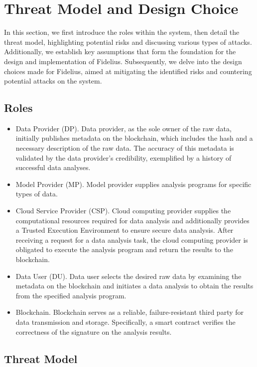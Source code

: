 \section{Threat Model and Design Choice}

In this section, we first introduce the roles within the system, then detail the threat model, highlighting potential risks and discussing various types of attacks. Additionally, we establish key assumptions that form the foundation for the design and implementation of Fidelius. Subsequently, we delve into the design choices made for Fidelius, aimed at mitigating the identified risks and countering potential attacks on the system.

\subsection{Roles}
\begin{itemize}
    \item Data Provider (DP). Data provider, as the sole owner of the raw data, initially publishes metadata on the blockchain, which includes the hash and a necessary description of the raw data. The accuracy of this metadata is validated by the data provider's credibility, exemplified by a history of successful data analyses.
    \item Model Provider (MP). Model provider supplies analysis programs for specific types of data.
    \item Cloud Service Provider (CSP). Cloud computing provider supplies the computational resources required for data analysis and additionally provides a Trusted Execution Environment to ensure secure data analysis. After receiving a request for a data analysis task, the cloud computing provider is obligated to execute the analysis program and return the results to the blockchain.
    \item Data User (DU). Data user selects the desired raw data by examining the metadata on the blockchain and initiates a data analysis to obtain the results from the specified analysis program.
    \item Blockchain. Blockchain serves as a reliable, failure-resistant third party for data transmission and storage. Specifically, a smart contract verifies the correctness of the signature on the analysis results.
\end{itemize}

\subsection{Threat Model}\label{subsec:threatmodel}

